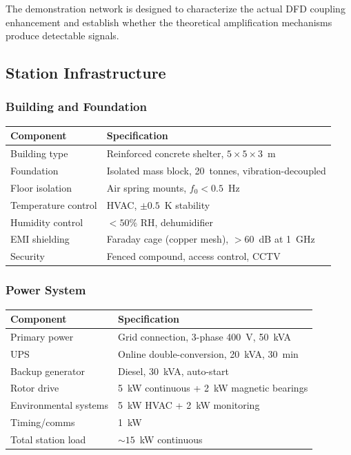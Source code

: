\documentclass[11pt,a4paper]{article}
\begin{document}
The demonstration network is designed to characterize the actual
DFD coupling enhancement and establish whether the theoretical
amplification mechanisms produce detectable signals.

\subsection{Station Infrastructure}

\subsubsection{Building and Foundation}

\begin{longtable}{p{5cm}p{8cm}}
\toprule
\textbf{Component} & \textbf{Specification} \\
\midrule
\endfirsthead
Building type & Reinforced concrete shelter, $5\times5\times3$~m \\
Foundation & Isolated mass block, 20~tonnes, vibration-decoupled \\
Floor isolation & Air spring mounts, $f_0 < 0.5$~Hz \\
Temperature control & HVAC, $\pm 0.5$~K stability \\
Humidity control & $< 50\%$ RH, dehumidifier \\
EMI shielding & Faraday cage (copper mesh), $> 60$~dB at 1~GHz \\
Security & Fenced compound, access control, CCTV \\
\bottomrule
\end{longtable}

\subsubsection{Power System}

\begin{longtable}{p{5cm}p{8cm}}
\toprule
\textbf{Component} & \textbf{Specification} \\
\midrule
\endfirsthead
Primary power & Grid connection, 3-phase 400~V, 50~kVA \\
UPS & Online double-conversion, 20~kVA, 30~min \\
Backup generator & Diesel, 30~kVA, auto-start \\
Rotor drive & 5~kW continuous + 2~kW magnetic bearings \\
Environmental systems & 5~kW HVAC + 2~kW monitoring \\
Timing/comms & 1~kW \\
Total station load & $\sim 15$~kW continuous \\
\bottomrule
\end{longtable}
\end{document}
